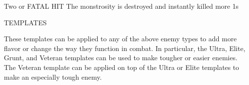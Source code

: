                                                                                                                  


Two or     FATAL HIT              The monstrosity is destroyed and instantly killed 
more  
1s 

                                                                                                          


                                       TEMPLATES
 

These templates can be applied to any of the above enemy types to add more flavor or change  
the way they function in combat. In particular, the Ultra, Elite, Grunt, and Veteran templates can  
be used to make tougher or easier enemies. The Veteran template can be applied on top of the  
Ultra or Elite templates to make an especially tough enemy.
 